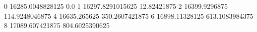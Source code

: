 0 16285.0048828125 0.0
1 16297.8291015625 12.82421875
2 16399.9296875 114.9248046875
4 16635.265625 350.2607421875
6 16898.11328125 613.1083984375
8 17089.607421875 804.6025390625
